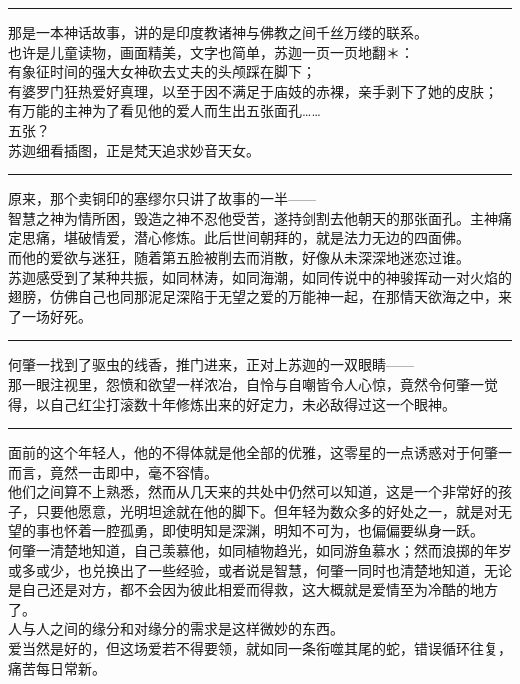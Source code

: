 \documentclass[oneside,11pt]{memoir} %
\begin{document}
\begin{CJK}{UTF8}{gbsn}
\rule{-3pt}{30pt}
    那是一本神话故事，讲的是印度教诸神与佛教之间千丝万缕的联系。\\\indent
    也许是儿童读物，画面精美，文字也简单，苏迦一页一页地翻＊：\\\indent
    有象征时间的强大女神砍去丈夫的头颅踩在脚下；\\\indent
    有婆罗门狂热爱好真理，以至于因不满足于庙妓的赤裸，亲手剥下了她的皮肤；\\\indent
    有万能的主神为了看见他的爱人而生出五张面孔……\\\indent
    五张？\\\indent
    苏迦细看插图，正是梵天追求妙音天女。\\\indent
\rule{-3pt}{30pt}
    原来，那个卖铜印的塞缪尔只讲了故事的一半——\\\indent
    智慧之神为情所困，毁造之神不忍他受苦，遂持剑割去他朝天的那张面孔。主神痛定思痛，堪破情爱，潜心修炼。此后世间朝拜的，就是法力无边的四面佛。\\\indent
    而他的爱欲与迷狂，随着第五脸被削去而消散，好像从未深深地迷恋过谁。\\\indent
    苏迦感受到了某种共振，如同林涛，如同海潮，如同传说中的神骏挥动一对火焰的翅膀，仿佛自己也同那泥足深陷于无望之爱的万能神一起，在那情天欲海之中，来了一场好死。\\\indent
\rule{-3pt}{30pt}
    何肇一找到了驱虫的线香，推门进来，正对上苏迦的一双眼睛——\\\indent
    那一眼注视里，怨愤和欲望一样浓冶，自怜与自嘲皆令人心惊，竟然令何肇一觉得，以自己红尘打滚数十年修炼出来的好定力，未必敌得过这一个眼神。\\\indent
\rule{-3pt}{30pt}
    面前的这个年轻人，他的不得体就是他全部的优雅，这零星的一点诱惑对于何肇一而言，竟然一击即中，毫不容情。\\\indent
    他们之间算不上熟悉，然而从几天来的共处中仍然可以知道，这是一个非常好的孩子，只要他愿意，光明坦途就在他的脚下。但年轻为数众多的好处之一，就是对无望的事也怀着一腔孤勇，即使明知是深渊，明知不可为，也偏偏要纵身一跃。\\\indent
    何肇一清楚地知道，自己羡慕他，如同植物趋光，如同游鱼慕水；然而浪掷的年岁或多或少，也兑换出了一些经验，或者说是智慧，何肇一同时也清楚地知道，无论是自己还是对方，都不会因为彼此相爱而得救，这大概就是爱情至为冷酷的地方了。\\\indent
    人与人之间的缘分和对缘分的需求是这样微妙的东西。\\\indent
    爱当然是好的，但这场爱若不得要领，就如同一条衔噬其尾的蛇，错误循环往复，痛苦每日常新。\\\indent

\end{CJK}
\end{document}
